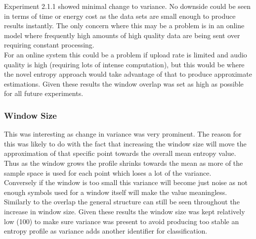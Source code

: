 Experiment 2.1.1 showed minimal change to variance. No downside could be seen in terms of time or energy cost as the data sets are small enough to produce results instantly. The only concern where this may be a problem is in an online model where frequently high amounts of high quality data are being sent over requiring constant processing.\\

For an online system this could be a problem if upload rate is limited and audio quality is high (requiring lots of intense computation), but this would be where the novel entropy approach would take advantage of that to produce approximate estimations. Given these results the window overlap was set as high as possible for all future experiments. 

\subsubsection{Window Size}
This was interesting as change in variance was very prominent. The reason for this was likely to do with the fact that increasing the window size will move the approximation of that specific point towards the overall mean entropy value. Thus as the window grows the profile shrinks towards the mean as more of the sample space is used for each point which loses a lot of the variance.\\

Conversely if the window is too small this variance will become just noise as not enough symbols used for a window itself will make the value meaningless. Similarly to the overlap the general structure can still be seen throughout the increase in window size. Given these results the window size was kept relatively low (100) to make sure variance was present to avoid producing too stable an entropy profile as variance adds another identifier for classification.






